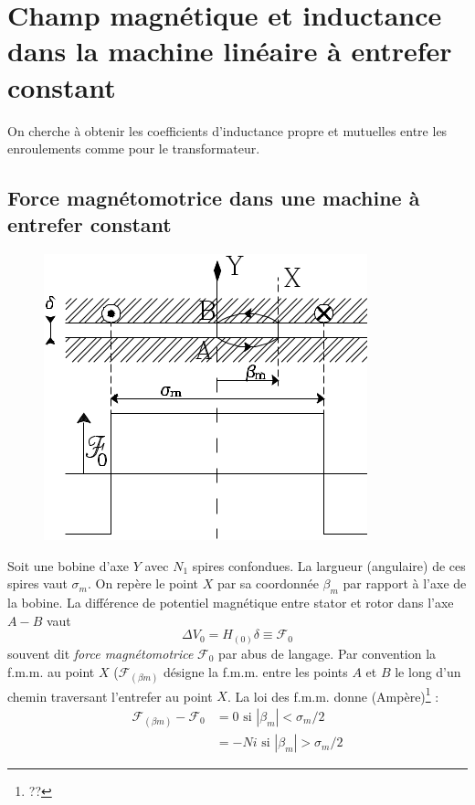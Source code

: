 	
\section{Champ magnétique et inductance dans la machine linéaire à entrefer constant}
On cherche à obtenir les coefficients d'inductance propre et mutuelles entre les enroulements 
comme pour le transformateur.

	\subsection{Force magnétomotrice dans une machine à entrefer constant}
		\begin{figure}
	\vspace{-5mm}
	\includegraphics[scale=0.38]{ch5/image9.png}
	\end{figure}
	Soit une bobine d'axe $Y$ avec $N_1$ spires confondues. La largueur (angulaire) de 
	ces spires vaut $\sigma_m$. On repère le point $X$ par sa coordonnée $\beta_m$ par 
	rapport à l'axe de la bobine. La différence de potentiel magnétique entre stator 
	et rotor dans l'axe $A-B$ vaut 
	\begin{equation}
	\Delta V_0 = H_{(0)}\delta \equiv \mathcal{F}_0
	\end{equation}
	souvent dit \textit{force magnétomotrice} $\mathcal{F}_0$ par abus de langage. Par 
	convention la f.m.m. au point $X$ ($\mathcal{F}_{(\beta m)}$ désigne la f.m.m. entre 
	les points $A$ et $B$ le long d'un chemin traversant l'entrefer au point $X$. La loi 
	des f.m.m. donne (Ampère)\footnote{??} :
	\begin{equation}
	\begin{array}{ll}
	\mathcal{F}_{(\beta m)} - \mathcal{F}_0 &= 0  \text{ si } |\beta_m|<\sigma_m/2\\
	&= -Ni  \text{ si } |\beta_m|>\sigma_m/2
	\end{array}
	\end{equation}
